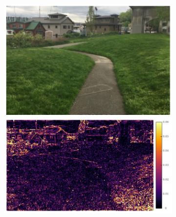 \documentclass{article}
\begin{document}
\begin{figure}
\begin{subfigure}{0.25\textwidth}
	\centering
    \includegraphics[width=1\linewidth]{qua_imgs/720p_240fps_1_bmbc.jpg}
\end{subfigure}%
\begin{subfigure}{0.25\textwidth}
	\centering

\end{subfigure}
\end{figure}
\end{document}
